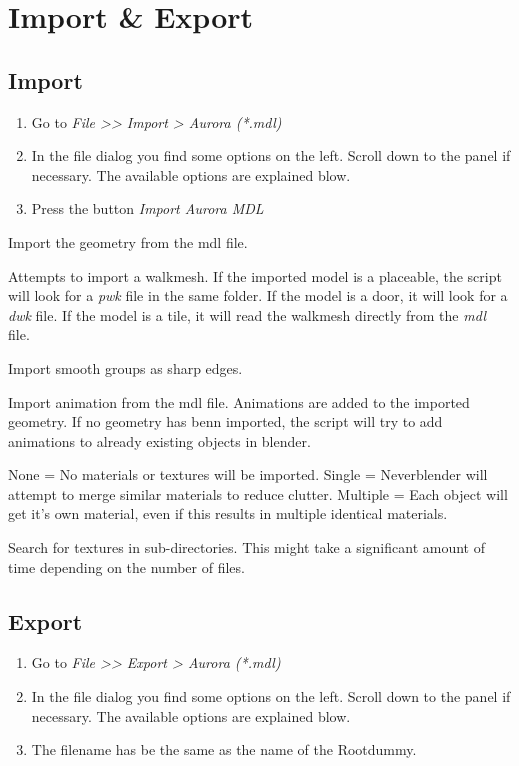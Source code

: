 \chapter{Import \& Export}

\section{Import}
\begin{enumerate}
	\item Go to \textit{File >> Import > Aurora (*.mdl)}
	\item In the file dialog you find some options on the left. Scroll down to the panel if necessary. The available options are explained blow.
	\item Press the button \textit{Import Aurora MDL}
\end{enumerate}

\begin{description}[leftmargin=13em,style=nextline]
    \item[Import Geometry] Import the geometry from the mdl file.
    \item[Import Walkmesh] Attempts to import a walkmesh. If the imported model is a placeable, the script will look for a {\textit{pwk}} file in the same folder. If the model is a door, it will look for a {\textit{dwk}} file. If the model is a tile, it will read the walkmesh directly from the {\textit{mdl}} file.
    \item[Import Smooth Groups] Import smooth groups as sharp edges.
    \item[Import Animations] Import animation from the mdl file. Animations are added to the imported geometry. If no geometry has benn imported, the script will try to add animations to already existing objects in blender.
    \item[Materials] None = No materials or textures will be imported. Single = Neverblender will attempt to merge similar materials to reduce clutter. Multiple = Each object will get it's own material, even if this results in multiple identical materials.
    \item[Image Search] Search for textures in sub-directories. This might take a significant amount of time depending on the number of files.
\end{description}

\section{Export}
\begin{enumerate}
	\item Go to \textit{File >> Export > Aurora (*.mdl)}
	\item In the file dialog you find some options on the left. Scroll down to the panel if necessary. The available options are explained blow.
	\item The filename has be the same as the name of the Rootdummy.
\end{enumerate}

